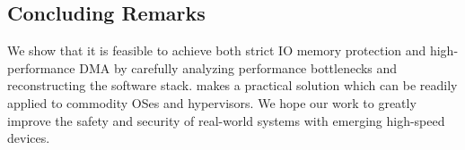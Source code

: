 \subsection{Concluding Remarks}

We show that it is feasible to achieve both strict IO memory protection
    and high-performance DMA by 
    carefully analyzing performance bottlenecks
    and reconstructing the software stack.
{\vfreename} makes a practical solution which can be readily applied to 
    commodity OSes and hypervisors.
We hope our work to greatly improve the safety 
    and security of real-world systems with emerging high-speed 
    devices.